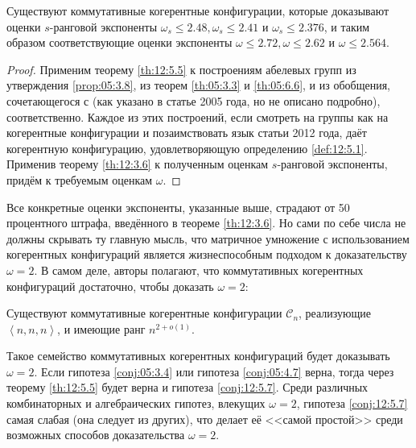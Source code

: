 \begin{theorem}\label{th:12:5.6} 
  Существуют коммутативные когерентные конфигурации, которые доказывают оценки $s$-ранговой экспоненты $\omega_s \leq 2.48, \omega_s \leq 2.41$ и $\omega_s \leq 2.376$, и таким образом соответствующие оценки экспоненты $\omega \leq 2.72, \omega \leq 2.62$ и $\omega \leq 2.564$.
\end{theorem}
\begin{proof}
  Применим теорему \ref{th:12:5.5} к построениям абелевых групп из утверждения \ref{prop:05:3.8}, из теорем \ref{th:05:3.3} и \ref{th:05:6.6}, и из обобщения, сочетающегося с \cite{Coppersmith:1990} (как указано в статье 2005 года, но не описано подробно), соответственно. Каждое из этих построений, если смотреть на группы как на когерентные конфигурации и позаимствовать язык статьи 2012 года, даёт когерентную конфигурацию, удовлетворяющую определению \ref{def:12:5.1}. Применив теорему \ref{th:12:3.6} к полученным оценкам $s$-ранговой экспоненты, придём к требуемым оценкам $\omega$.
\end{proof}

Все конкретные оценки экспоненты, указанные выше, страдают от 50 процентного штрафа, введённого в теореме \ref{th:12:3.6}. Но сами по себе числа не должны скрывать ту главную мысль, что матричное умножение с использованием когерентных конфигураций является жизнеспособным подходом к доказательству $\omega=2$. В самом деле, авторы полагают, что коммутативных когерентных конфигураций достаточно, чтобы доказать $\omega=2$:
\begin{conj}\label{conj:12:5.7}
  Существуют коммутативные когерентные конфигурации $\mathscr{C}_n$, реализующие $\left\langle n,n,n \right\rangle$, и имеющие ранг $n^{2+o(1)}$.
\end{conj}

Такое семейство коммутативных когерентных конфигураций будет доказывать $\omega=2$. Если гипотеза \ref{conj:05:3.4} или гипотеза \ref{conj:05:4.7} верна, тогда через теорему \ref{th:12:5.5} будет верна и гипотеза \ref{conj:12:5.7}. Среди различных комбинаторных и алгебраических гипотез, влекущих $\omega=2$, гипотеза \ref{conj:12:5.7} самая слабая (она следует из других), что делает её <<самой простой>> среди возможных способов доказательства $\omega=2$.

